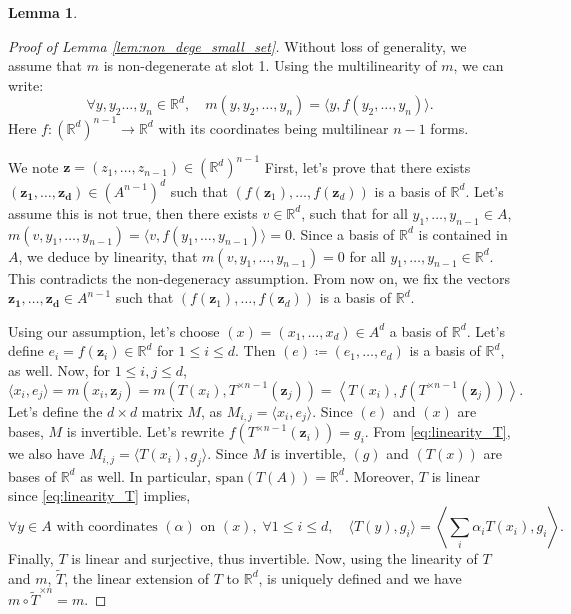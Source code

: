 \documentclass{article}
\newcommand{\R}{\mathbb{R}}
\newcommand{\1}{\mathbf{1}}
\newtheorem{lemma}{Lemma}
\theoremstyle{definition}
\theoremstyle{remark}
\begin{document}
\begin{appendices}
\begin{lemma}
\end{lemma}

\begin{proof}[Proof of Lemma \ref{lem:non_dege_small_set}]
    Without loss of generality, we assume that $m$ is non-degenerate at slot 1. Using the multilinearity of $m$, we can write:
    \[\forall y, y_2\dots,y_n\in \R^d,\quad m(y, y_2,\dots,y_n) = \langle y, f(y_2,\dots,y_n)\rangle.\]
    Here $f:(\R^d)^{n-1}\to\R^d$ with its coordinates being multilinear $n-1$ forms. 
    
    We note $\mathbf{z} = (z_1,\dots,z_{n-1})\in (\R^d)^{n-1}$ First, let's prove that there exists $(\mathbf{z_1},\dots,\mathbf{z_d})\in (A^{n-1})^d$ such that  $(f(\mathbf{z}_1),\dots,f(\mathbf{z}_d))$ is a basis of $\R^d$. Let's assume this is not true, then there exists $v\in \R^d$, such that for all $y_1,\dots,y_{n-1}\in A$, $m(v,y_1,\dots,y_{n-1})=\langle v, f(y_1,\dots,y_{n-1})\rangle=0.$ Since a basis of $\R^d$ is contained in $A$, we deduce by linearity, that $m(v,y_1,\dots,y_{n-1}) = 0$ for all $y_1,\dots,y_{n-1}\in \R^d$. This contradicts the non-degeneracy assumption. From now on, we  fix the vectors $\mathbf{z_1},\dots,\mathbf{z_d}\in A^{n-1}$ such that  $(f(\mathbf{z}_1),\dots,f(\mathbf{z}_d))$ is a basis of $\R^d$.



    
    Using our assumption, let's choose $(x)=(x_1,\dots,x_d)\in A^d$ a basis of $\R^d$. Let's define  $e_i = f(\mathbf{z}_i)\in \R^d$ for $1\leq i\leq d$. Then  $(e)\coloneqq (e_1,\dots,e_d)$ is a basis of $\R^d$, as well. Now, for $1\leq i,j\leq d$, 
    \begin{equation}\label{eq:linearity_T}
        \langle x_i,e_j\rangle = m(x_i, \mathbf{z}_j) =m(T(x_i), T^{\times n-1}(\mathbf{z}_j)) = \left\langle T(x_i),f(T^{\times n-1}(\mathbf{z}_j))\right\rangle.
    \end{equation}
    Let's define the $d\times d$ matrix $M$, as $M_{i,j} = \langle x_i,e_j\rangle$. Since $(e)$ and $(x)$ are bases, $M$ is invertible. Let's rewrite $f(T^{\times n-1}(\mathbf{z}_i)) = g_i$. From \eqref{eq:linearity_T}, we also have $M_{i,j} = \langle T(x_i), g_j\rangle$. Since $M$ is invertible,  $(g)$ and $(T(x))$ are bases of $\R^d$ as well. In particular, $\mathrm{span}(T(A))=\R^d$. Moreover, $T$ is linear since  \eqref{eq:linearity_T} implies, 
    \[\forall y \in A \text{ with coordinates }(\alpha) \text{ on } (x), \;\forall1\leq i\leq d, \quad \langle T(y),g_i\rangle = \left\langle \sum_i\alpha_iT(x_i),g_i\right\rangle.\]
    Finally, $T$ is linear and surjective, thus invertible. Now, using the linearity of $T$ and $m$, $\tilde{T}$, the linear extension of $T$ to $\R^d$, is uniquely defined and we have $m\circ \tilde{T}^{\times n}=m$.
\end{proof}




\end{appendices}
\end{document}
